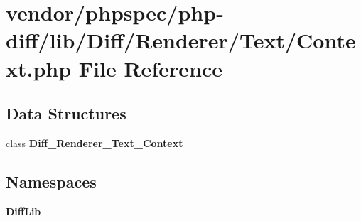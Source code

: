 \section{vendor/phpspec/php-\/diff/lib/\+Diff/\+Renderer/\+Text/\+Context.php File Reference}
\label{phpspec_2php-diff_2lib_2_diff_2_renderer_2_text_2_context_8php}
\subsection*{Data Structures}
\begin{DoxyCompactItemize}
\item 
class {\bf Diff\+\_\+\+Renderer\+\_\+\+Text\+\_\+\+Context}
\end{DoxyCompactItemize}
\subsection*{Namespaces}
\begin{DoxyCompactItemize}
\item 
 {\bf Diff\+Lib}
\end{DoxyCompactItemize}
